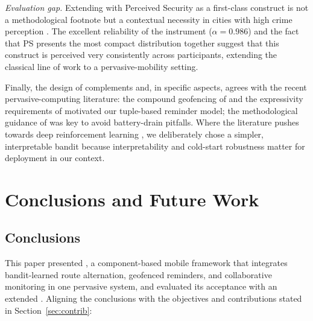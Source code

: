 \documentclass[a4paper,fleqn]{cas-sc}
\begin{document}
	\emph{Evaluation gap.} Extending \TAM{} with Perceived Security as a first-class construct is not a methodological footnote but a contextual necessity in cities with high crime perception \citep{tapia2024inseguridad,maloney2025worldbank}. The excellent reliability of the instrument ($\alpha=0.986$) and the fact that PS presents the most compact distribution together suggest that this construct is perceived very consistently across participants, extending the classical \TAM{} line of work \citep{davis1989tam} to a pervasive-mobility setting.
	
	Finally, the design of \RUTAI{} complements and, in specific aspects, agrees with the recent pervasive-computing literature: the compound geofencing of \citet{garzon2014geofencing} and the expressivity requirements of \citet{wang2015beyond} motivated our tuple-based reminder model; the methodological guidance of \citet{shevchenko2024geofencing} was key to avoid battery-drain pitfalls. Where the literature pushes towards deep reinforcement learning \citep{zhang2025drlnavigation}, we deliberately chose a simpler, interpretable bandit because interpretability and cold-start robustness matter for deployment in our context.
	
	\section{Conclusions and Future Work}\label{sec:conclusion}
	
	\subsection{Conclusions}\label{sec:conclusions}
	
	This paper presented \RUTAI{}, a component-based mobile framework that integrates bandit-learned route alternation, geofenced reminders, and collaborative monitoring in one pervasive system, and evaluated its acceptance with an extended \TAM{}. Aligning the conclusions with the objectives and contributions stated in Section~\ref{sec:contrib}:
	
\end{document}
